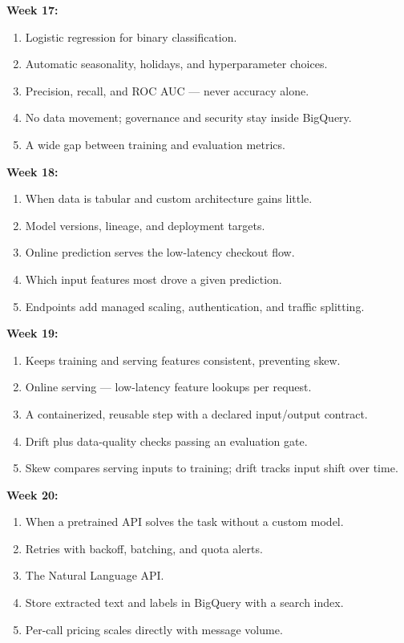 \documentclass[11pt, a4paper]{article}
\begin{document}
\textbf{Week 17:}
\begin{enumerate}[nosep, leftmargin=1.5em]
    \item Logistic regression for binary classification.
    \item Automatic seasonality, holidays, and hyperparameter choices.
    \item Precision, recall, and ROC AUC --- never accuracy alone.
    \item No data movement; governance and security stay inside BigQuery.
    \item A wide gap between training and evaluation metrics.
\end{enumerate}

\textbf{Week 18:}
\begin{enumerate}[nosep, leftmargin=1.5em]
    \item When data is tabular and custom architecture gains little.
    \item Model versions, lineage, and deployment targets.
    \item Online prediction serves the low-latency checkout flow.
    \item Which input features most drove a given prediction.
    \item Endpoints add managed scaling, authentication, and traffic splitting.
\end{enumerate}

\textbf{Week 19:}
\begin{enumerate}[nosep, leftmargin=1.5em]
    \item Keeps training and serving features consistent, preventing skew.
    \item Online serving --- low-latency feature lookups per request.
    \item A containerized, reusable step with a declared input/output contract.
    \item Drift plus data-quality checks passing an evaluation gate.
    \item Skew compares serving inputs to training; drift tracks input shift over time.
\end{enumerate}

\textbf{Week 20:}
\begin{enumerate}[nosep, leftmargin=1.5em]
    \item When a pretrained API solves the task without a custom model.
    \item Retries with backoff, batching, and quota alerts.
    \item The Natural Language API.
    \item Store extracted text and labels in BigQuery with a search index.
    \item Per-call pricing scales directly with message volume.
\end{enumerate}
\end{document}
